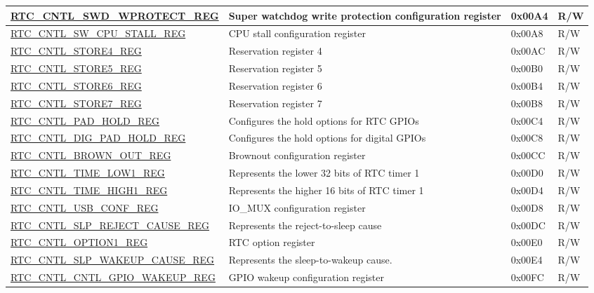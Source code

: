 \begin{longtable}{ | l | L{6.5cm} | l | l | }
\hyperref[regdesc:RTCCNTLSWDWPROTECTREG]{RTC\_CNTL\_SWD\_WPROTECT\_REG} & Super watchdog write protection configuration register & 0x00A4 & R/W \\ \hline
\hyperref[regdesc:RTCCNTLSWCPUSTALLREG]{RTC\_CNTL\_SW\_CPU\_STALL\_REG} & CPU stall configuration register & 0x00A8 & R/W \\ \hline
\hyperref[regdesc:RTCCNTLSTORE4REG]{RTC\_CNTL\_STORE4\_REG} & Reservation register 4 & 0x00AC & R/W \\ \hline
\hyperref[regdesc:RTCCNTLSTORE5REG]{RTC\_CNTL\_STORE5\_REG} & Reservation register 5 & 0x00B0 & R/W \\ \hline
\hyperref[regdesc:RTCCNTLSTORE6REG]{RTC\_CNTL\_STORE6\_REG} & Reservation register 6 & 0x00B4 & R/W \\ \hline
\hyperref[regdesc:RTCCNTLSTORE7REG]{RTC\_CNTL\_STORE7\_REG} & Reservation register 7 & 0x00B8 & R/W \\ \hline
\hyperref[regdesc:RTCCNTLPADHOLDREG]{RTC\_CNTL\_PAD\_HOLD\_REG} & Configures the hold options for RTC GPIOs & 0x00C4 & R/W \\ \hline
\hyperref[regdesc:RTCCNTLDIGPADHOLDREG]{RTC\_CNTL\_DIG\_PAD\_HOLD\_REG} & Configures the hold options for digital GPIOs & 0x00C8 & R/W \\ \hline
\hyperref[regdesc:RTCCNTLBROWNOUTREG]{RTC\_CNTL\_BROWN\_OUT\_REG} & Brownout configuration register & 0x00CC & R/W \\ \hline
\hyperref[regdesc:RTCCNTLTIMELOW1REG]{RTC\_CNTL\_TIME\_LOW1\_REG} & Represents the lower 32 bits of RTC timer 1 & 0x00D0 & R/W \\ \hline
\hyperref[regdesc:RTCCNTLTIMEHIGH1REG]{RTC\_CNTL\_TIME\_HIGH1\_REG} & Represents the higher 16 bits of RTC timer 1 & 0x00D4 & R/W \\ \hline
\hyperref[regdesc:RTCCNTLUSBCONFREG]{RTC\_CNTL\_USB\_CONF\_REG} & IO\_MUX configuration register & 0x00D8 & R/W \\ \hline
\hyperref[regdesc:RTCCNTLSLPREJECTCAUSEREG]{RTC\_CNTL\_SLP\_REJECT\_CAUSE\_REG} & Represents the reject-to-sleep cause & 0x00DC & R/W \\ \hline
\hyperref[regdesc:RTCCNTLOPTION1REG]{RTC\_CNTL\_OPTION1\_REG} & RTC option register & 0x00E0 & R/W \\ \hline
\hyperref[regdesc:RTCCNTLSLPWAKEUPCAUSEREG]{RTC\_CNTL\_SLP\_WAKEUP\_CAUSE\_REG} & Represents the sleep-to-wakeup cause. & 0x00E4 & R/W \\ \hline
\hyperref[regdesc:RTCCNTLCNTLGPIOWAKEUPREG]{RTC\_CNTL\_CNTL\_GPIO\_WAKEUP\_REG} & GPIO wakeup configuration register & 0x00FC & R/W \\ \hline

\end{longtable}
